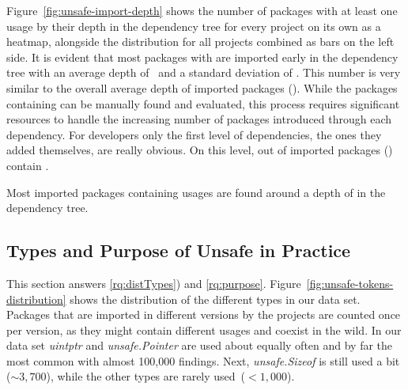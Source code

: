 Figure~\ref{fig:unsafe-import-depth} shows the number of packages with at least one \unsafe{} usage by their depth in the dependency tree for every project on its own as a heatmap, alongside the distribution for all projects combined as bars on the left side.
It is evident that most packages with \unsafe{} are imported early in the dependency tree with an average depth of \averageUnsafeImportDepth{}~and a standard deviation of \stdUnsafeImportDepth{}.
This number is very similar to the overall average depth of imported packages (\averageGeneralImportDepth{}). %
While the packages containing \unsafe{} can be manually found and evaluated, this process requires significant resources to handle the increasing number of packages introduced through each dependency. 
For developers only the first level of dependencies, the ones they added themselves, are really obvious.
On this level, \levelOneImportedUnsafePackagesCount{} out of \ImportedUnsafePackagesCount{} imported packages (\levelOneImportedUnsafePackagesShare{}) contain \unsafe{}.

\begin{tcolorbox}[boxsep=1pt, enlarge top by=5pt, title=Answer to \ref{rq:depsDepth}]
Most imported packages containing \unsafe{} usages are found around a depth of  in the dependency tree.
\end{tcolorbox}




\subsection{Types and Purpose of Unsafe in Practice}

This section answers \ref{rq:distTypes}) and \ref{rq:purpose}.
%
Figure~\ref{fig:unsafe-tokens-distribution} shows the distribution of the different \unsafe{} types in our data set.
Packages that are imported in different versions by the projects are counted once per version, as they might contain different \unsafe{} usages and coexist in the wild.
In our data set \textit{uintptr} and \textit{unsafe.Pointer} are used about equally often and by far the most common with almost 100,000 findings. 
Next, \textit{unsafe.Sizeof} is still used a bit ($\sim 3,700$), while the other \unsafe{} types are rarely used~($< 1,000$).

